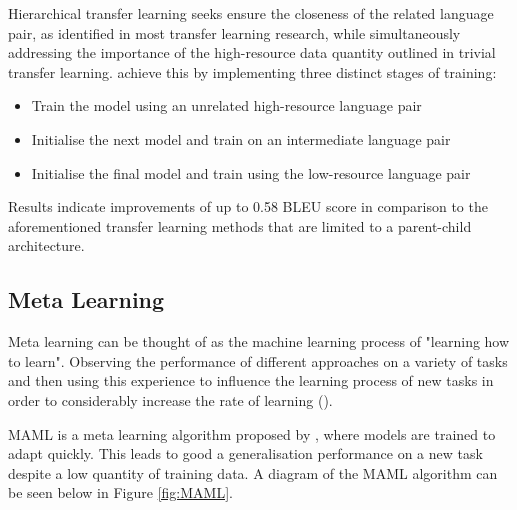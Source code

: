 Hierarchical transfer learning seeks ensure the closeness of the related language pair, as identified in most transfer learning research, while simultaneously addressing the importance of the high-resource data quantity outlined in trivial transfer learning. \cite{luo_hierarchical_2019} achieve this by implementing three distinct stages of training:

\begin{itemize}
  \item Train the model using an unrelated high-resource language pair
  \item Initialise the next model and train on an intermediate language pair
  \item Initialise the final model and train using the low-resource language pair
\end{itemize}

Results indicate improvements of up to 0.58 \acrshort{BLEU} score in comparison to the aforementioned transfer learning methods that are limited to a parent-child architecture.




\subsection{Meta Learning}

Meta learning can be thought of as the machine learning process of "learning how to learn". Observing the performance of different approaches on a variety of tasks and then using this experience to influence the learning process of new tasks in order to considerably increase the rate of learning (\cite{vanschoren_meta-learning:_2018}).


\acrfull{MAML} is a meta learning algorithm proposed by \cite{finn_model-agnostic_2017}, where models are trained to adapt quickly. This leads to good a generalisation performance on a new task despite a low quantity of training data.
A diagram of the \acrshort{MAML} algorithm can be seen below in Figure \ref{fig:MAML}.


